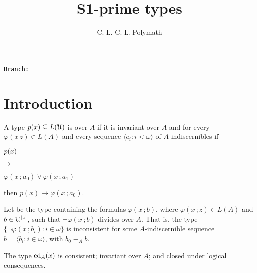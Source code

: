 \documentclass[10pt,oneside]{amsproc}
\title{S1-prime types}
\author{C. L. C. L. Polymath}
\renewcommand*{\emph}[1]{%
   \smash{\tikz[baseline]\node[rectangle, fill=teal!25, rounded corners, inner xsep=0.5ex, inner ysep=0.2ex, anchor=base, minimum height = 2.7ex]{\strut #1};}}
\newcommand\branch{}
\begin{document}
\hfill\texttt{Branch:\ \branch\ \ \DTMnow}\bigskip
\maketitle
\raggedbottom

\newcommand\questionsign[1][2ex]{%
  \renewcommand\stacktype{L}%
  \scaleto{\stackon[-.6pt]{\color{red}$\triangle$}{\color{red}\bfseries\small ?}}{#1}%
}

\newcommand\dangersign[1][2ex]{%
  \renewcommand\stacktype{L}%
  \scaleto{\stackon[-.6pt]{\color{red}$\triangle$}{\color{red}\bfseries\small !}}{#1}%
}
\def\equivL{\stackrel{\smash{\scalebox{.5}{\rm L}}}{\equiv}}


\section{Introduction}\label{intro}

A type $p(x)\subseteq L({\EuScript U})$ is \emph{S1-prime\/} over $A$ if it is invariant over $A$ and for every $\varphi(x\,z)\in L(A)$ and every sequence $\langle a_i:i<\omega\rangle$ of $A$-indiscernibles if 

\def\ceq#1#2#3{\parbox[t]{20ex}{$\displaystyle #1$}\parbox[t]{6ex}{$\displaystyle\hfil #2$}{$\displaystyle #3$}}

\ceq{\hfill p(x)}{\rightarrow}{\varphi(x\,;a_0)\vee\varphi(x\,;a_1)}

then $p(x)\rightarrow\varphi(x\,;a_0)$.

Let \emph{${\rm cd}_A(x)$\/} be the type containing the formulas $\varphi(x\,;b)$, where $\varphi(x\,;z)\in L(A)$ and $b\in{\EuScript U}^{|z|}$, such that $\neg\varphi(x\,;b)$ divides over $A$.
That is, the type $\{\neg\varphi(x\,;b_i):i\in\omega\}$ is inconsistent for some $A$-indiscernible sequence $\bar b=\langle b_i:i\in\omega\rangle$, with $b_0\equiv_Ab$.

\begin{fact}
  The type ${\rm cd}_A(x)$ is consistent; invariant over $A$; and closed under logical consequences.
\end{fact}
\end{document}
